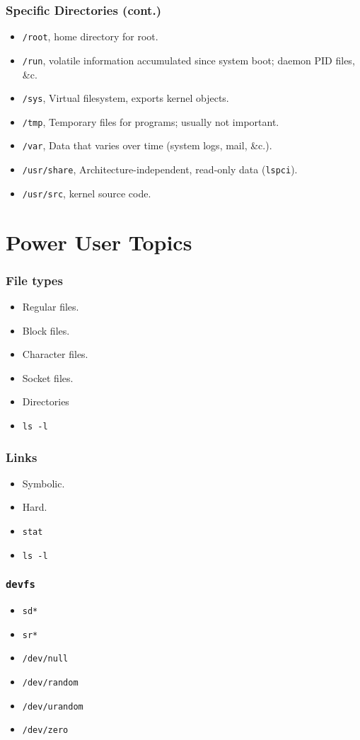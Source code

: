 \documentclass[xcolor={dvipsnames,svgnames},hyperref=dvips]{beamer}
\begin{document}
	\begin{frame}
		\frametitle{Specific Directories (cont.)}
		\begin{itemize}
		\item \texttt{/root}, home directory for root.
		\item \texttt{/run}, volatile information accumulated since system boot; daemon PID files, \&c.
		\item \texttt{/sys}, Virtual filesystem, exports kernel objects.
		\item \texttt{/tmp}, Temporary files for programs; usually not important.
		\item \texttt{/var}, Data that varies over time (system logs, mail, \&c.).
		\item \texttt{/usr/share}, Architecture-independent, read-only data (\texttt{lspci}).
		\item \texttt{/usr/src}, kernel source code.
		\end{itemize}
	\end{frame}

\section{Power User Topics}\label{section:poweruser}
	\begin{frame}
		\frametitle{File types}
		\begin{itemize}
		\item Regular files.
		\item Block files.
		\item Character files.
		\item Socket files.
		\item Directories
		\item \texttt{ls -l}
		\end{itemize}
	\end{frame}

	\begin{frame}
		\frametitle{Links}
		\begin{itemize}
		\item Symbolic.
		\item Hard.
		\item \texttt{stat}
		\item \texttt{ls -l}
		\end{itemize}
	\end{frame}

	\begin{frame}
		\frametitle{\texttt{devfs}}
		\begin{itemize}
		\item \texttt{sd*}
		\item \texttt{sr*}
		\item \texttt{/dev/null}
		\item \texttt{/dev/random}
		\item \texttt{/dev/urandom}
		\item \texttt{/dev/zero}
		\end{itemize}
	\end{frame}
\end{document}
